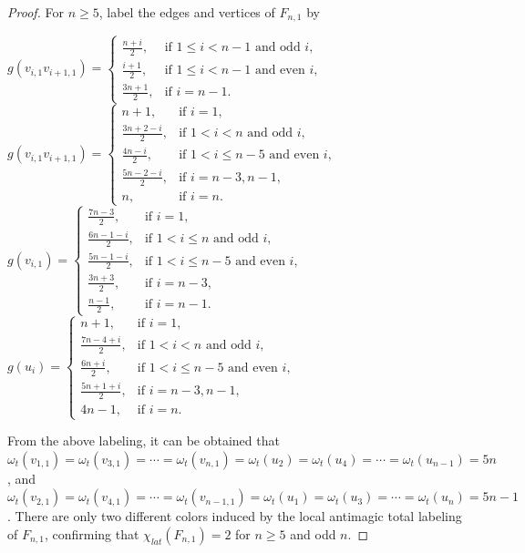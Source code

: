\documentclass[12pt]{article}
\begin{document}
\begin{proof}
For $n\geq 5$, label the edges and vertices of $F_{n,1}$ by
\begin{center}
$g(v_{i,1}v_{i+1,1})=\begin{cases}
\frac{n+i}{2}, & \text{if $1\leq i<n-1$ and odd $i$},\\[4pt]
\frac{i+1}{2}, & \text{if $1\leq i<n-1$ and even $i$},\\[4pt]
\frac{3n+1}{2}, &\text{if $i=n-1$}. \end{cases}$\vspace{0.4em}
$g(v_{i,1}v_{i+1,1})=\begin{cases}
n+1, & \text{if } i=1,\\[4pt]
\frac{3n+2-i}{2}, & \text{if $1< i<n$ and odd $i$},\\[4pt]
\frac{4n-i}{2}, & \text{if $1< i\leq n-5$ and even $i$},\\[4pt]
\frac{5n-2-i}{2}, & \text{if } i=n-3,n-1,\\[4pt]
n, &\text{if $i=n$}. \end{cases}$\vspace{0.4em}
 $g(v_{i,1})=\begin{cases}
\frac{7n-3}{2}, & \text{if } i=1,\\[4pt]
\frac{6n-1-i}{2}, & \text{if $1< i\leq n$ and odd $i$},\\[4pt]
\frac{5n-1-i}{2}, & \text{if $1< i\leq n-5$ and even $i$},\\[4pt]
\frac{3n+3}{2}, & \text{if } i=n-3,\\[4pt]
\frac{n-1}{2}, &\text{if $i=n-1$}. \end{cases}$\vspace{0.4em}
$g(u_{i})=\begin{cases}
n+1, & \text{if } i=1,\\[4pt]
\frac{7n-4+i}{2}, & \text{if $1< i<n$ and odd $i$},\\[4pt]
\frac{6n+i}{2}, & \text{if $1< i\leq n-5$ and even $i$},\\[4pt]
\frac{5n+1+i}{2}, & \text{if } i=n-3,n-1,\\[4pt]
4n-1, &\text{if $i=n$}. \end{cases}$
\end{center}

From the above labeling, it can be obtained that $\omega_{t}(v_{1,1})=\omega_{t}(v_{3,1})=\cdots=\omega_{t}(v_{n,1})=\omega_{t}(u_{2})=\omega_{t}(u_{4})=\cdots=\omega_{t}(u_{n-1})=5n$, and
$\omega_{t}(v_{2,1})=\omega_{t}(v_{4,1})=\cdots=\omega_{t}(v_{n-1,1})=\omega_{t}(u_{1})=\omega_{t}(u_{3})=\cdots=\omega_{t}(u_{n})=5n-1$.
There are only two different colors induced by the local antimagic total labeling of $F_{n,1}$, confirming that $\chi_{lat}(F_{n,1})=2$ for $n\geq 5$ and odd $n$.


\end{proof}
\end{document}
